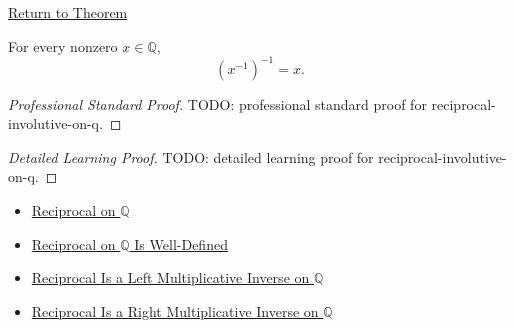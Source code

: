 \newpage
{}
\label{prf:reciprocal-involutive-on-q}

\begin{remark*}[Return]
\hyperref[thm:reciprocal-involutive-on-q]{Return to Theorem}
\end{remark*}

\begin{theorem*}
For every nonzero $x\in\mathbb{Q}$,
\[
(x^{-1})^{-1}=x.
\]
\end{theorem*}

\begin{proof}[Professional Standard Proof]
\LRAProofBodyStart
TODO: professional standard proof for reciprocal-involutive-on-q.
\end{proof}

\begin{proof}[Detailed Learning Proof]
\LRAProofBodyStart
TODO: detailed learning proof for reciprocal-involutive-on-q.
\end{proof}

\begin{remark*}
\end{remark*}

\begin{dependencies}
\begin{itemize}
  \item \hyperref[def:reciprocal-on-q-classes]{Reciprocal on $\mathbb{Q}$}
  \item \hyperref[thm:reciprocal-on-q-well-defined]{Reciprocal on $\mathbb{Q}$ Is Well-Defined}
  \item \hyperref[thm:reciprocal-left-multiplicative-inverse-on-q]{Reciprocal Is a Left Multiplicative Inverse on $\mathbb{Q}$}
  \item \hyperref[cor:reciprocal-right-multiplicative-inverse-on-q]{Reciprocal Is a Right Multiplicative Inverse on $\mathbb{Q}$}
\end{itemize}
\end{dependencies}

\clearpage
